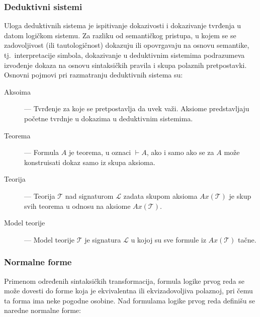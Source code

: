 \documentclass[a4paper,10pt]{article}
\begin{document}
\subsubsection{Deduktivni sistemi}

Uloga deduktivnih sistema je ispitivanje dokazivosti i dokazivanje tvrđenja u datom logičkom sistemu. Za razliku od semantičkog pristupa, u kojem se se zadovoljivost (ili tautologičnost) dokazuju ili opovrgavaju na osnovu semantike, tj.~interpretacije simbola, dokazivanje u deduktivnim sistemima podrazumeva izvođenje dokaza na osnovu sintaksičkih pravila i skupa polaznih pretpostavki. Osnovni pojmovi pri razmatranju deduktivnih sistema su:

\begin{description}
    \item[Aksoima] --- Tvrđenje za koje se pretpostavlja da uvek važi. Aksiome predstavljaju početne tvrdnje u dokazima u deduktivnim sistemima.
    \item[Teorema] --- Formula $A$ je teorema, u oznaci $\vdash A$, ako i samo ako se za $A$ može konstruisati dokaz samo iz skupa aksioma.
    \item[Teorija] --- Teorija $\mathcal{T}$ nad signaturom $\mathcal{L}$ zadata skupom aksioma $Ax(\mathcal{T})$ je skup svih teorema u odnosu na aksiome $Ax(\mathcal{T})$.
    \item[Model teorije] --- Model teorije $\mathcal{T}$ je signatura $\mathcal{L}$ u kojoj su sve formule iz $Ax(\mathcal{T})$ tačne.
\end{description}

\subsubsection{Normalne forme}

Primenom određenih sintaksičkih transformacija, formula logike prvog reda se može dovesti do forme koja je ekvivalentna ili ekvizadovoljiva polaznoj, pri čemu ta forma ima neke pogodne osobine. Nad formulama logike prvog reda definišu se naredne normalne forme:
\end{document}
